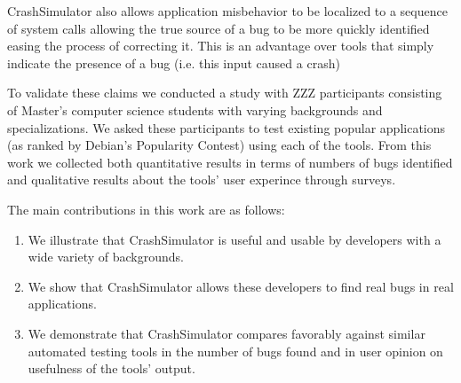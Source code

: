 CrashSimulator also allows application misbehavior to be localized to a
sequence of system calls allowing the true source of a bug to be more
quickly identified easing the process of correcting it.  This is an
advantage over tools that simply indicate the presence of a bug (i.e.  this
input caused a crash)

To validate these claims we conducted a study with ZZZ participants
consisting of Master's computer science students with varying backgrounds
and specializations.  We asked these participants to test existing popular
applications (as ranked by Debian's Popularity Contest) using each of the
tools.  From this work we collected both quantitative results in terms of
numbers of bugs identified and qualitative results about the tools' user
experince through surveys.

The main contributions in this work are as follows:

\begin{enumerate}

\item We illustrate that CrashSimulator is useful and usable by developers
with a wide variety of backgrounds.

\item We show that CrashSimulator allows these developers to find real bugs
in real applications.

\item We demonstrate that CrashSimulator compares favorably against similar
automated testing tools in the number of bugs found and in user opinion on
usefulness of the tools' output.

\end{enumerate}
